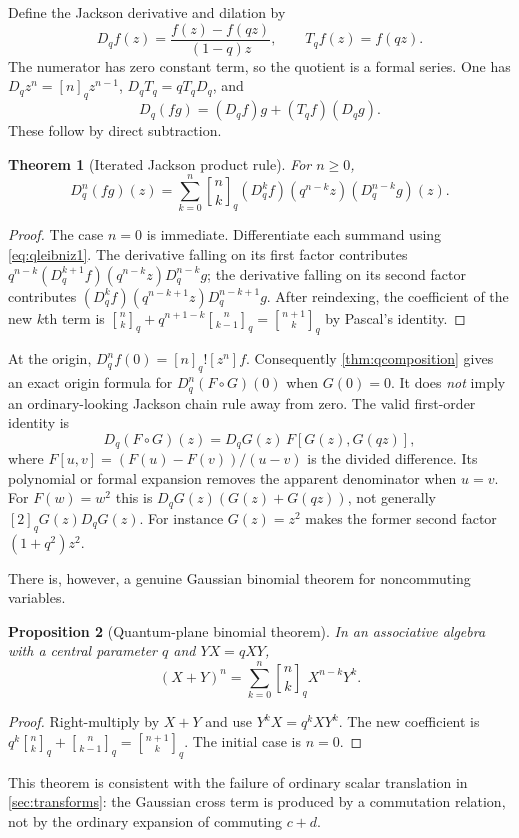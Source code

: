 \documentclass[11pt,a4paper]{article}
\numberwithin{equation}{section}
\newtheorem{theorem}{Theorem}[section]
\newtheorem{proposition}[theorem]{Proposition}
\theoremstyle{definition}
\theoremstyle{remark}
\newcommand{\qb}[2]{\genfrac{[}{]}{0pt}{}{#1}{#2}_{q}}
\newcommand{\qf}[1]{[#1]_{q}!}
\newcommand{\qi}[1]{[#1]_{q}}
\begin{document}
Define the Jackson derivative and dilation by
\begin{equation}\label{eq:Jackson}
 D_qf(z)=\frac{f(z)-f(qz)}{(1-q)z},\qquad T_qf(z)=f(qz).
\end{equation}
The numerator has zero constant term, so the quotient is a formal series.
One has $D_qz^n=\qi n z^{n-1}$, $D_qT_q=qT_qD_q$, and
\begin{equation}\label{eq:qleibniz1}
 D_q(fg)=(D_qf)g+(T_qf)(D_qg).
\end{equation}
These follow by direct subtraction.

\begin{theorem}[Iterated Jackson product rule]\label{thm:jackson}
For $n\ge0$,
\begin{equation}\label{eq:qleibniz}
 D_q^n(fg)(z)=\sum_{k=0}^n\qb nk
       (D_q^kf)(q^{n-k}z)(D_q^{n-k}g)(z).
\end{equation}
\end{theorem}
\begin{proof}
The case $n=0$ is immediate. Differentiate each summand using
\eqref{eq:qleibniz1}. The derivative falling on its first factor contributes
$q^{n-k}(D_q^{k+1}f)(q^{n-k}z)D_q^{n-k}g$; the derivative falling on its second
factor contributes $(D_q^kf)(q^{n-k+1}z)D_q^{n-k+1}g$.
After reindexing, the coefficient of the new $k$th term is
$\qb nk+q^{n+1-k}\qb n{k-1}=\qb{n+1}k$ by Pascal's identity.
\end{proof}

At the origin, $D_q^nf(0)=\qf n[z^n]f$. Consequently
\cref{thm:qcomposition} gives an exact origin formula for
$D_q^n(F\circ G)(0)$ when $G(0)=0$. It does \emph{not} imply an ordinary-looking
Jackson chain rule away from zero. The valid first-order identity is
\begin{equation}\label{eq:qchain}
 D_q(F\circ G)(z)=D_qG(z)\,
       F[G(z),G(qz)],
\end{equation}
where $F[u,v]=(F(u)-F(v))/(u-v)$ is the divided difference. Its polynomial or
formal expansion removes the apparent denominator when $u=v$.
For $F(w)=w^2$ this is
$D_qG(z)(G(z)+G(qz))$, not generally $\qi2 G(z)D_qG(z)$.
For instance $G(z)=z^2$ makes the former second factor $(1+q^2)z^2$.

There is, however, a genuine Gaussian binomial theorem for noncommuting variables.
\begin{proposition}[Quantum-plane binomial theorem]\label{prop:quantum-plane}
In an associative algebra with a central parameter $q$ and $YX=qXY$,
\begin{equation}\label{eq:quantum-plane}
 (X+Y)^n=\sum_{k=0}^n\qb nk X^{n-k}Y^k.
\end{equation}
\end{proposition}
\begin{proof}
Right-multiply by $X+Y$ and use $Y^kX=q^kXY^k$.
The new coefficient is $q^k\qb nk+\qb n{k-1}=\qb{n+1}k$.
The initial case is $n=0$.
\end{proof}
This theorem is consistent with the failure of ordinary scalar translation in
\cref{sec:transforms}: the Gaussian cross term is produced by a commutation
relation, not by the ordinary expansion of commuting $c+d$.
\end{document}
